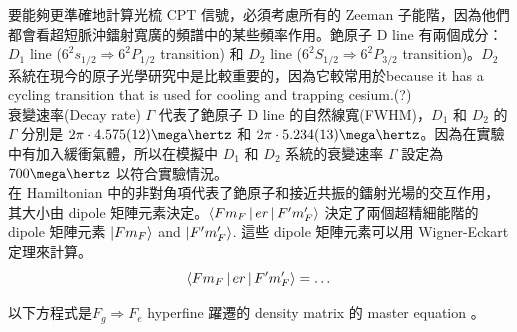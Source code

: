\documentclass[11pt,a4paper]{article}
\begin{document}
要能夠更準確地計算光梳 CPT 信號，必須考慮所有的 Zeeman 子能階，因為他們都會看超短脈沖鐳射寬廣的頻譜中的某些頻率作用。銫原子 D line 有兩個成分：$D_1$ line ($6^2s_{1/2}\Rightarrow 6^2P_{1/2}$ transition) 和 $D_2$ line ($6^2S_{1/2}\Rightarrow6^2P_{3/2}$ transition)。$D_2$ 系統在現今的原子光學研究中是比較重要的，因為它較常用於because it has a cycling transition that is used for cooling and trapping cesium.(?)\\

衰變速率(Decay rate) $\Gamma$ 代表了銫原子 D line 的自然線寬(FWHM)，$D_1$ 和 $D_2$ 的 $\Gamma$ 分別是 $2\pi \cdot 4.575(12) \mega\hertz$ 和 $2\pi \cdot 5.234(13) \mega\hertz$。因為在實驗中有加入緩衝氣體，所以在模擬中 $D_1$ 和 $D_2$ 系統的衰變速率 $\Gamma$ 設定為 $700 \mega\hertz$ 以符合實驗情況。\\%

在 Hamiltonian 中的非對角項代表了銫原子和接近共振的鐳射光場的交互作用，其大小由 dipole 矩陣元素決定。$\Braket{F m_F | er | F^{\prime} m_F^{\prime}}$ 決定了兩個超精細能階的 dipole 矩陣元素 $\ket{ F m_F }$ and $\ket{ F^{\prime} m_F^{\prime}}$. 這些 dipole 矩陣元素可以用 Wigner-Eckart 定理來計算。\\

\begin{equation}
\Braket{ F m_F | er | F^{\prime} m_F^{\prime}} =\dots
\end{equation}

以下方程式是$F_g \Rightarrow F_e$ hyperfine 躍遷的 density matrix 的 master equation \cite{Steck2003}。
\end{document}

